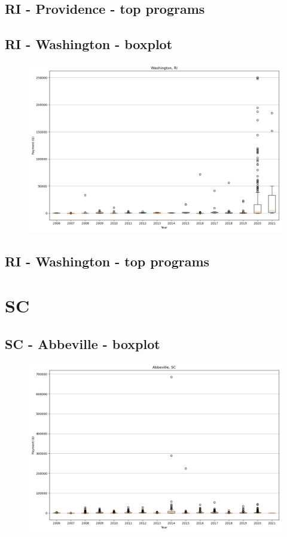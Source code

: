 \subsection*{RI - Providence - top programs}

\newpage
\subsection*{RI - Washington - boxplot}
\begin{figure}[h]
\centering
\includegraphics[width=7in]{../output/boxplots/counties/Washington-RI_boxplot.png}
\end{figure}


\subsection*{RI - Washington - top programs}

\newpage
\section*{SC}
\subsection*{SC - Abbeville - boxplot}
\begin{figure}[h]
\centering
\includegraphics[width=7in]{../output/boxplots/counties/Abbeville-SC_boxplot.png}
\end{figure}


